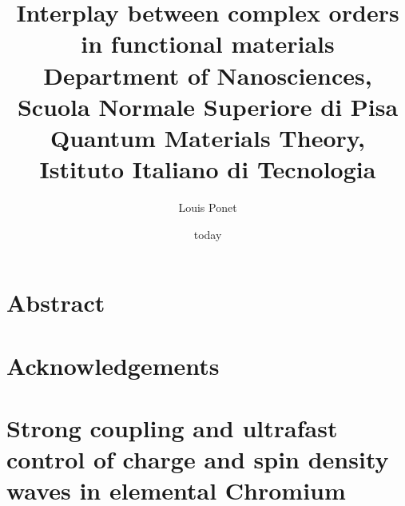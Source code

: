 \documentclass[10pt,a4paper]{book}
\title{
	{Interplay between complex orders in functional materials}\\
	{\large Department of Nanosciences, Scuola Normale Superiore di Pisa}\\
	{\large Quantum Materials Theory, Istituto Italiano di Tecnologia}}
\author{Louis Ponet}
\date{today}
\def\Include#1{%
        \def\ChapterPath{#1/}%
        \def\GraphicsPath{\ChapterPath Images/}%
        }
\begin{document}
\chapter*{Abstract}
\chapter*{Acknowledgements}
\tableofcontents

\Include{Introduction}
\Include{Theory}
\Include{Rashba}
\Include{Cr}
\Include{GdMn2O5}
\Include{Softening}
\chapter{Strong coupling and ultrafast control of charge and spin density waves in elemental Chromium}
% 
\end{document}
